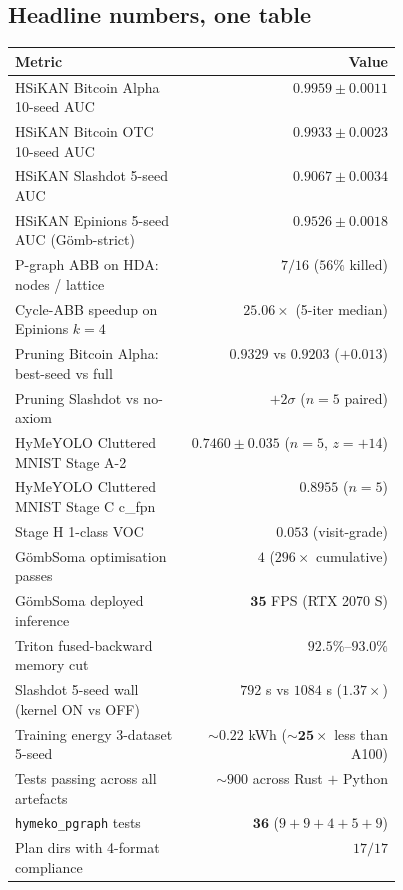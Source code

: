 \documentclass[11pt,a4paper]{article}
\theoremstyle{plain}
\theoremstyle{definition}
\newcommand{\code}[1]{\texttt{\small #1}}
\begin{document}
\subsection{Headline numbers, one table}

\begin{center}\small
\begin{tabular}{p{0.45\linewidth} r}
\toprule
Metric & Value \\
\midrule
HSiKAN Bitcoin Alpha 10-seed AUC          & $\mathbf{0.9959 \pm 0.0011}$ \\
HSiKAN Bitcoin OTC 10-seed AUC            & $\mathbf{0.9933 \pm 0.0023}$ \\
HSiKAN Slashdot 5-seed AUC                & $\mathbf{0.9067 \pm 0.0034}$ \\
HSiKAN Epinions 5-seed AUC (Gömb-strict)  & $\mathbf{0.9526 \pm 0.0018}$ \\
\midrule
P-graph ABB on HDA: nodes / lattice       & $7 / 16$ ($56\%$ killed) \\
Cycle-ABB speedup on Epinions $k{=}4$     & $\mathbf{25.06\times}$ (5-iter median) \\
Pruning Bitcoin Alpha: best-seed vs full  & $0.9329$ vs $0.9203$ ($+0.013$) \\
Pruning Slashdot vs no-axiom              & $+2\sigma$ ($n{=}5$ paired) \\
\midrule
HyMeYOLO Cluttered MNIST Stage A-2       & $0.7460 \pm 0.035$ ($n{=}5$, $z{=}{+}14$) \\
HyMeYOLO Cluttered MNIST Stage C c\_fpn  & $0.8955$ ($n{=}5$) \\
Stage H 1-class VOC                      & $0.053$ (visit-grade) \\
\midrule
GömbSoma optimisation passes              & $4$ ($296\times$ cumulative) \\
GömbSoma deployed inference               & $\mathbf{35}$ FPS (RTX 2070 S) \\
\midrule
Triton fused-backward memory cut         & $\mathbf{92.5\%}$–$\mathbf{93.0\%}$ \\
Slashdot 5-seed wall (kernel ON vs OFF)   & $792$ s vs $1084$ s ($1.37\times$) \\
\midrule
Training energy 3-dataset 5-seed         & ${\sim}0.22$ kWh ($\mathbf{{\sim}25\times}$ less than A100) \\
Tests passing across all artefacts        & ${\sim}900$ across Rust $+$ Python \\
\code{hymeko\_pgraph} tests               & $\mathbf{36}$ ($9 + 9 + 4 + 5 + 9$) \\
Plan dirs with 4-format compliance       & $17 / 17$ \\
\bottomrule
\end{tabular}
\end{center}
\end{document}
